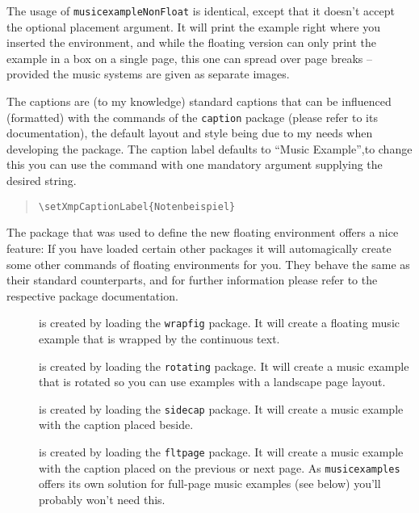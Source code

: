 \documentclass{OLLbook}
\begin{document}
The usage of \texttt{musicexampleNonFloat} is identical, except that it doesn't accept the optional placement argument.
It will print the example right where you inserted the environment, and while the floating version can only print the example in a box on a single page, this one can spread over page breaks -- provided the music systems are given as separate images.

The captions are (to my knowledge) standard captions that can be influenced (formatted) with the commands of the \texttt{caption} package (please refer to its documentation), the default layout and style being due to my needs when developing the package.
The caption label defaults to “Music Example”,to change this you can use the command  with one mandatory argument supplying the desired string.
\begin{quote}
\begin{verbatim}
\setXmpCaptionLabel{Notenbeispiel}
\end{verbatim}
\end{quote}

The  package that was used to define the new floating environment offers a nice feature:
If you have loaded certain other packages it will automagically create some other commands of floating environments for you.
They behave the same as their standard counterparts, and for further information please refer to the respective package documentation.

\begin{description}
\item[] is created by loading the \texttt{wrapfig} package.
It will create a floating music example that is wrapped by the continuous text.
\item[] is created by loading the \texttt{rotating} package.
It will create a music example that is rotated so you can use examples with a landscape page layout.
\item[] is created by loading the \texttt{sidecap} package.
It will create a music example with the caption placed beside.
\item[{}] is created by loading the \texttt{fltpage} package.
It will create a music example with the caption placed on the previous or next page.
As \texttt{musicexamples} offers its own solution for full-page music examples (see below) you'll probably won't need this.
\end{description}
\end{document}
